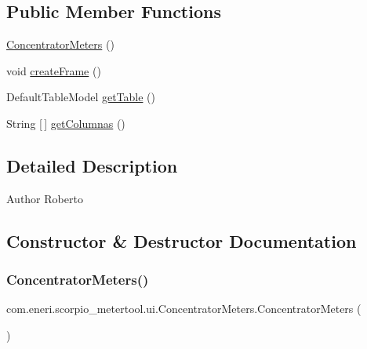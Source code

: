 \subsection*{Public Member Functions}
\begin{DoxyCompactItemize}
\item 
\hyperlink{classcom_1_1eneri_1_1scorpio__metertool_1_1ui_1_1_concentrator_meters_a2e6a09ad7b0a97d184a09edc6d09ebd0}{Concentrator\+Meters} ()
\item 
void \hyperlink{classcom_1_1eneri_1_1scorpio__metertool_1_1ui_1_1_concentrator_meters_a768838dcac3a91224c8c00429678a225}{create\+Frame} ()
\item 
Default\+Table\+Model \hyperlink{classcom_1_1eneri_1_1scorpio__metertool_1_1ui_1_1_concentrator_meters_a7e3c4686f13b9d2dbf73569a2837cf8a}{get\+Table} ()
\item 
String \mbox{[}$\,$\mbox{]} \hyperlink{classcom_1_1eneri_1_1scorpio__metertool_1_1ui_1_1_concentrator_meters_a11dbe21f32ca6e0c09a17de4f0de0cea}{get\+Columnas} ()
\end{DoxyCompactItemize}


\subsection{Detailed Description}
\begin{DoxyAuthor}{Author}
Roberto 
\end{DoxyAuthor}


\subsection{Constructor \& Destructor Documentation}
\mbox{\label{classcom_1_1eneri_1_1scorpio__metertool_1_1ui_1_1_concentrator_meters_a2e6a09ad7b0a97d184a09edc6d09ebd0}} 
\subsubsection{\texorpdfstring{Concentrator\+Meters()}{ConcentratorMeters()}}
{\footnotesize\ttfamily com.\+eneri.\+scorpio\+\_\+metertool.\+ui.\+Concentrator\+Meters.\+Concentrator\+Meters (\begin{DoxyParamCaption}{ }\end{DoxyParamCaption})}



